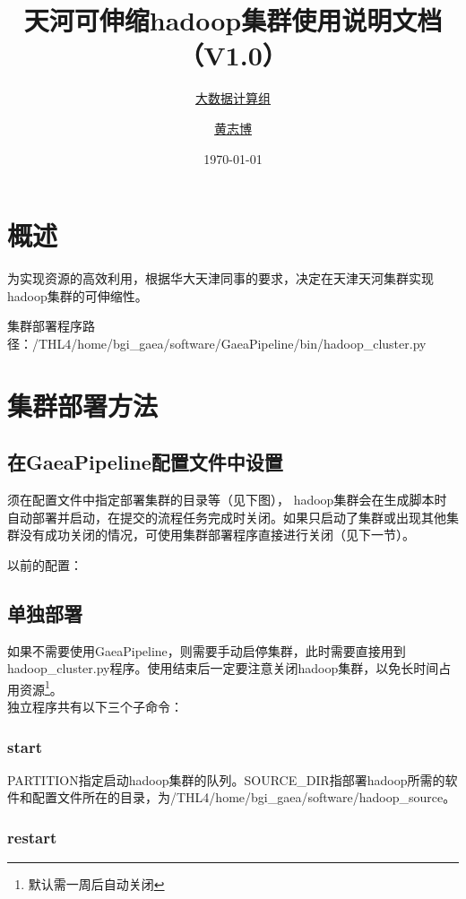 \documentclass[UTF8,10pt,a4paper]{ctexart}
\title{天河可伸缩hadoop集群使用说明文档{\small （V1.0）}}
\author{\href{http://bigdata.genomics.cn/}{大数据计算组} \and 
\href{mailto:huangzhibo@genomics.cn}{黄志博}}
\date{\today}
\begin{document}
\maketitle
\tableofcontents
\newpage
\setlength{\parskip}{1ex plus 0.5ex minus 0.2ex}


\section{概述}
\label{sec:1}

为实现资源的高效利用，根据华大天津同事的要求，决定在天津天河集群实现hadoop集群的可伸缩性。

集群部署程序路径：/THL4/home/bgi\_gaea/software/GaeaPipeline/bin/hadoop\_cluster.py

\section{集群部署方法}
\subsection{在GaeaPipeline配置文件中设置}
须在配置文件中指定部署集群的目录等（见下图）， hadoop集群会在生成脚本时自动部署并启动，在提交的流程任务完成时关闭。如果只启动了集群或出现其他集群没有成功关闭的情况，可使用集群部署程序直接进行关闭（见下一节）。

\indent 以前的配置：


\subsection{单独部署}
如果不需要使用GaeaPipeline，则需要手动启停集群，此时需要直接用到hadoop\_cluster.py程序。使用结束后一定要注意关闭hadoop集群，以免长时间占用资源\footnote{默认需一周后自动关闭}。\\
\indent 独立程序共有以下三个子命令：

\subsubsection{start}
PARTITION指定启动hadoop集群的队列。SOURCE\_DIR指部署hadoop所需的软件和配置文件所在的目录，为/THL4/home/bgi\_gaea/software/hadoop\_source。

\subsubsection{restart}

\end{document}
